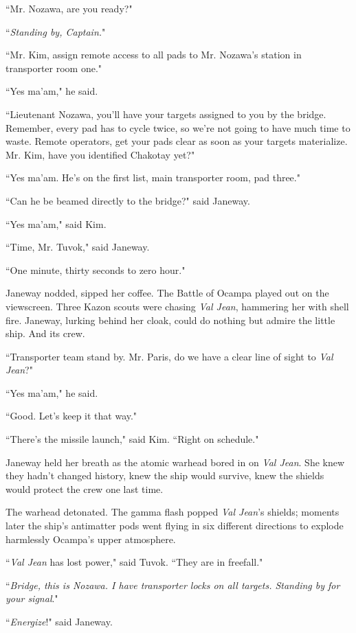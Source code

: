 \documentclass[twoside,letterpaper,12pt]{memoir}
\begin{document}
``Mr. Nozawa, are you ready?" 

``\textit{Standing by, Captain.}" 

``Mr. Kim, assign remote access to all pads to Mr. Nozawa's station in transporter room one." 

``Yes ma'am," he said. 

``Lieutenant Nozawa, you'll have your targets assigned to you by the bridge. Remember, every pad has to cycle twice, so we're not going to have much time to waste. Remote operators, get your pads clear as soon as your targets materialize. Mr. Kim, have you identified Chakotay yet?" 

``Yes ma'am. He's on the first list, main transporter room, pad three." 

``Can he be beamed directly to the bridge?" said Janeway. 

``Yes ma'am," said Kim. 

``Time, Mr. Tuvok," said Janeway. 

``One minute, thirty seconds to zero hour." 

Janeway nodded, sipped her coffee. The Battle of Ocampa played out on the viewscreen. Three Kazon scouts were chasing \textit{Val Jean}, hammering her with shell fire. Janeway, lurking behind her cloak, could do nothing but admire the little ship. And its crew. 

``Transporter team stand by. Mr. Paris, do we have a clear line of sight to \textit{Val Jean}?" 

``Yes ma'am," he said. 

``Good. Let's keep it that way." 

``There's the missile launch," said Kim. ``Right on schedule." 

Janeway held her breath as the atomic warhead bored in on \textit{Val Jean}. She knew they hadn't changed history, knew the ship would survive, knew the shields would protect the crew one last time. 

The warhead detonated. The gamma flash popped \textit{Val Jean}'s shields; moments later the ship's antimatter pods went flying in six different directions to explode harmlessly Ocampa's upper atmosphere. 

``\textit{Val Jean} has lost power," said Tuvok. ``They are in freefall." 

``\textit{Bridge, this is Nozawa. I have transporter locks on all targets. Standing by for your signal}." 

``\textit{Energize}!" said Janeway. 
\end{document}
